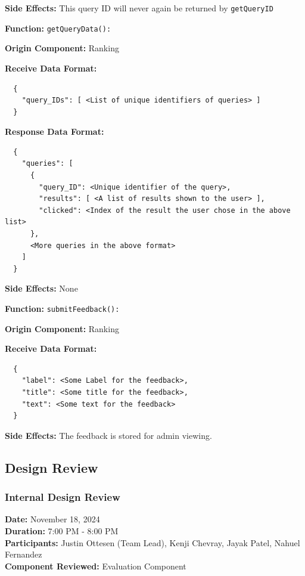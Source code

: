 \textbf{Side Effects:} This query ID will never again be returned by \verb|getQueryID|

\bigskip

\textbf{Function:} \verb|getQueryData():|

\smallskip

\textbf{Origin Component:} Ranking

\smallskip

\textbf{Receive Data Format:} \begin{verbatim}
  {
    "query_IDs": [ <List of unique identifiers of queries> ]
  }
\end{verbatim}

\textbf{Response Data Format:} \begin{verbatim}
  {
    "queries": [
      {
        "query_ID": <Unique identifier of the query>,
        "results": [ <A list of results shown to the user> ],
        "clicked": <Index of the result the user chose in the above list>
      }, 
      <More queries in the above format>
    ]
  }
\end{verbatim}

\smallskip

\textbf{Side Effects:} None

\bigskip

\textbf{Function:} \verb|submitFeedback():|

\smallskip

\textbf{Origin Component:} Ranking

\smallskip

\textbf{Receive Data Format:} \begin{verbatim}
  {
    "label": <Some Label for the feedback>,
    "title": <Some title for the feedback>,
    "text": <Some text for the feedback>
  }
\end{verbatim}

\smallskip

\textbf{Side Effects:} The feedback is stored for admin viewing.

\subsection*{Design Review}

\subsubsection*{Internal Design Review}

\textbf{Date:} November 18, 2024 \\
\textbf{Duration:} 7:00 PM - 8:00 PM \\
\textbf{Participants:} Justin Ottesen (Team Lead), Kenji Chevray, Jayak Patel, Nahuel Fernandez \\
\textbf{Component Reviewed:} Evaluation Component

